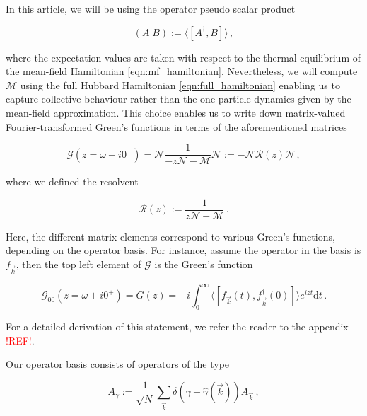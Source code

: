 \documentclass[
    reprint, 
    aps,
    preprintnumbers,
    twocolumn,
    prb,
    superscriptaddress
]{revtex4-2}
\newcommand{\vk}{\vec{k}}
\begin{document}
In this article, we will be using the operator pseudo scalar product

\begin{equation}
\label{eqn:scalar_product}
    (A | B) := \langle [A^\dagger, B] \rangle\,,
\end{equation}

where the expectation values are taken with respect to the thermal equilibrium of the mean-field Hamiltonian \eqref{eqn:mf_hamiltonian}.
Nevertheless, we will compute $\mathcal{M}$ using the full Hubbard Hamiltonian \eqref{eqn:full_hamiltonian} enabling us to capture collective behaviour rather than the one particle dynamics given by the mean-field approximation.
\newline
This choice enables us to write down matrix-valued Fourier-transformed Green's functions in terms of the aforementioned matrices

\begin{equation}
    \label{eqn:green_function}
    \mathcal{G}(z = \omega + i0^+) = \mathcal{N} \frac{1}{-z \mathcal{N} - \mathcal{M}} \mathcal{N} := -\mathcal{N} \mathcal{R}(z) \mathcal{N}\,,
\end{equation}

where we defined the resolvent

\begin{equation}
    \label{eqn:resolvent}
    \mathcal{R}(z) := \frac{1}{z \mathcal{N} + \mathcal{M}}\,.
\end{equation}

Here, the different matrix elements correspond to various Green's functions, depending on the operator basis.
For instance, assume the operator in the basis is $f_{\vk}$, then the top left element of $\mathcal{G}$ is the Green's function 

\begin{equation}
    \mathcal{G}_{00}(z = \omega +i0^+) =  G(z) = -i \int_0^{\infty} \langle [f_{\vk}(t), f_{\vk}^\dagger(0)] \rangle e^{izt} \mathrm{d}t\,.
\end{equation}

For a detailed derivation of this statement, we refer the reader to the appendix \textcolor{red}{!REF!}.

Our operator basis consists of operators of the type

\begin{equation}
    A_\gamma := \frac{1}{\sqrt{N}} \sum_{\vk} \delta (\gamma - \hat{\gamma}( \vk )) A_{\vk}\,,
\end{equation}
\end{document}
